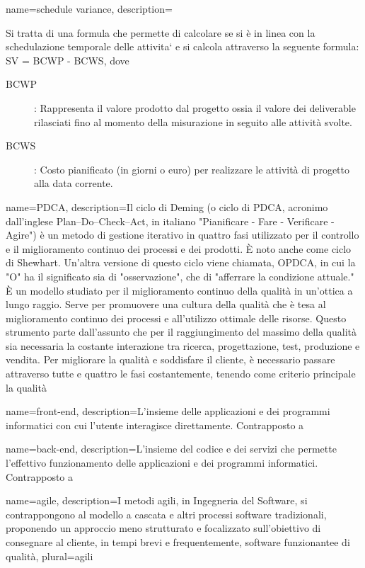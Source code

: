 {
	name=schedule variance,
	description={Si tratta di una formula che permette di calcolare se si è in linea con la schedulazione temporale delle attivita` e si calcola attraverso la seguente formula: SV = BCWP - BCWS, dove 
\begin{description}	
	\item[BCWP]: Rappresenta il valore prodotto dal progetto ossia il valore dei deliverable rilasciati fino al momento della misurazione in seguito alle attività svolte.
	\item[BCWS]: Costo pianificato (in giorni o euro) per realizzare le attività di progetto alla data corrente.
\end{description}}
}

{
	name=PDCA,
	description={Il ciclo di Deming (o ciclo di PDCA, acronimo dall'inglese Plan–Do–Check–Act, in italiano "Pianificare - Fare - Verificare - Agire") è un metodo di gestione iterativo in quattro fasi utilizzato per il controllo e il miglioramento continuo dei processi e dei prodotti. È noto anche come ciclo di Shewhart. Un'altra versione di questo ciclo viene chiamata, OPDCA, in cui la "O" ha il significato sia di "osservazione", che di "afferrare la condizione attuale."
È un modello studiato per il miglioramento continuo della qualità in un'ottica a lungo raggio. Serve per promuovere una cultura della qualità che è tesa al miglioramento continuo dei processi e all'utilizzo ottimale delle risorse. Questo strumento parte dall'assunto che per il raggiungimento del massimo della qualità sia necessaria la costante interazione tra ricerca, progettazione, test, produzione e vendita. Per migliorare la qualità e soddisfare il cliente, è necessario passare attraverso tutte e quattro le fasi costantemente, tenendo come criterio principale la qualità}
}

{
	name=front-end,
	description={L'insieme delle applicazioni e dei programmi informatici con cui l'utente interagisce direttamente. Contrapposto a }
}

{
	name=back-end,
	description={L'insieme del codice e dei servizi che permette l'effettivo funzionamento delle applicazioni e dei programmi informatici. Contrapposto a }
}

{
	name=agile,
	description={I metodi agili, in Ingegneria del Software, si contrappongono al modello a cascata e altri processi software tradizionali, proponendo un approccio meno strutturato e focalizzato sull’obiettivo di consegnare al cliente, in tempi brevi e frequentemente, software funzionantee di qualità},
	plural=agili
}

